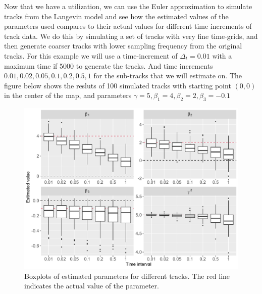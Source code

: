 Now that we have a utilization, we can use the Euler approximation to simulate tracks from the Langevin model and see how the estimated values of the parameters used compares to their actual values for different time increments of track data. We do this by simulating a set of tracks with very fine time-grids, and then generate coarser tracks with lower sampling frequency from the original tracks. For this example we will use a time-increment of $\Delta_t = 0.01$ with a maximum time if 5000 to generate the tracks. And time increments $0.01, 0.02, 0.05, 0.1, 0.2, 0.5, 1$ for the sub-tracks that we will estimate on. The figure below shows the resluts of 100 simulated tracks with starting point $(0,0)$ in the center of the map, and parameters $\gamma = 5, \beta_1= 4, \beta_2 = 2, \beta_3=-0.1$

\begin{figure}[H]
    \centering
    \includegraphics[width=\linewidth]{Images/example1/sim3par1.pdf}
    \caption[example 1 covariates]{Boxplots of estimated parameters for different tracks. The red line indicates the actual value of the parameter.}
    \label{fig:example_1_estimates}
\end{figure}

